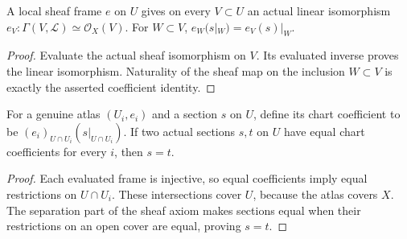 \begin{lemma}
\label{sc0-canonical-port:geom:local-frame-coefficients}
\leanok
A local sheaf frame \(e\) on \(U\) gives on every
\(V\subset U\) an actual linear isomorphism
\(e_V:\Gamma(V,\mathcal L)\simeq\mathcal O_X(V)\).
For \(W\subset V\),
\(e_W(s|_W)=e_V(s)|_W\).
\end{lemma}
\begin{proof}
Evaluate the actual sheaf isomorphism on \(V\). Its evaluated
inverse proves the linear isomorphism. Naturality of the sheaf
map on the inclusion \(W\subset V\) is exactly the asserted
coefficient identity.
\end{proof}

\begin{theorem}
\label{sc0-canonical-port:geom:atlas-section-separation}
\leanok
For a genuine atlas \((U_i,e_i)\) and a section \(s\) on
\(U\), define its chart coefficient to be
\((e_i)_{U\cap U_i}(s|_{U\cap U_i})\).
If two actual sections \(s,t\) on \(U\) have equal chart
coefficients for every \(i\), then \(s=t\).
\end{theorem}
\begin{proof}
Each evaluated frame is injective, so equal coefficients imply
equal restrictions on \(U\cap U_i\). These intersections
cover \(U\), because the atlas covers \(X\). The separation
part of the sheaf axiom makes sections equal when their
restrictions on an open cover are equal, proving \(s=t\).
\end{proof}

